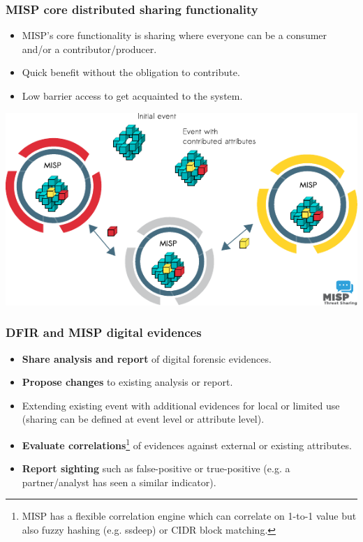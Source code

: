 \begin{frame}
\frametitle{MISP core distributed sharing functionality}
\begin{itemize}
\item MISP's core functionality is sharing where everyone can be a consumer and/or a contributor/producer.
\item Quick benefit without the obligation to contribute.
\item Low barrier access to get acquainted to the system.
\end{itemize}
\includegraphics[scale=0.9]{misp-distributed.pdf}
\end{frame}

\begin{frame}
\frametitle{DFIR and MISP digital evidences}
        \begin{itemize}
                \item {\bf Share analysis and report} of digital forensic evidences.
                \item {\bf Propose changes} to existing analysis or report.
                \item Extending existing event with additional evidences for local or limited use (sharing can be defined at event level or attribute level).
                \item {\bf Evaluate correlations}\footnote{MISP has a flexible correlation engine which can correlate on 1-to-1 value but also fuzzy hashing (e.g. ssdeep) or CIDR block matching.} of evidences against external or existing attributes.
                \item {\bf Report sighting} such as false-positive or true-positive (e.g. a partner/analyst has seen a similar indicator).
        \end{itemize}
\end{frame}

